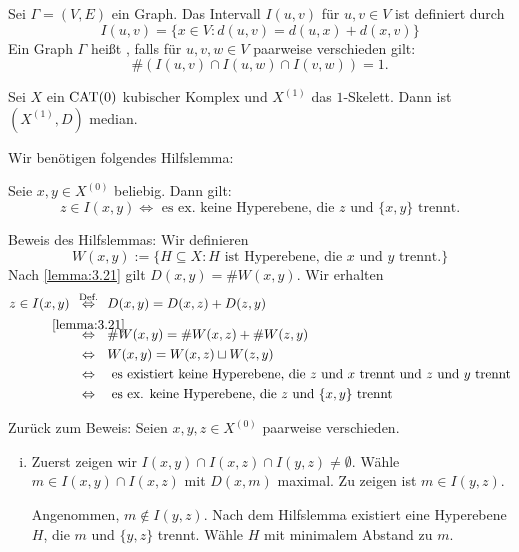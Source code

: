 \begin{definition}
	\label{def:3.22}
		Sei $\Gamma = (V,E)$ ein Graph.
		Das Intervall $I(u,v)$ für $u,v \in V$ ist definiert durch 
		\[
			I(u,v) = \{x \in V : d(u,v) = d(u,x) + d(x,v)\}
		\]
		Ein Graph $\Gamma$ heißt , falls für $u,v,w \in V$ paarweise verschieden gilt:
		\[
			\#(I(u,v) \cap I(u,w) \cap I(v,w)) = 1.
		\]
\end{definition}

\begin{satz}
	\label{satz:3.23}
		Sei $X$ ein $\operatorname{CAT(0)}$ kubischer Komplex und $X^{(1)}$ das $1$-Skelett.
		Dann ist $(X^{(1)},D)$ median.
\end{satz}

\begin{beweis}
	Wir benötigen folgendes Hilfslemma:
	
	Seie $x,y \in X^{(0)}$ beliebig.
	Dann gilt:
	\[
		z \in I(x,y) \Leftrightarrow \text{ es ex. keine Hyperebene, die } z \text{ und } \{x,y\} \text{ trennt.}
	\]
	
	Beweis des Hilfslemmas:
	Wir definieren
	\[
		W(x,y) := \{H \subseteq X : H \text{ ist Hyperebene, die } x \text{ und } y \text{ trennt.}\}
	\]
	Nach \autoref{lemma:3.21} gilt $D(x,y) = \#W(x,y)$.
	Wir erhalten
	\begin{align*}
		z \in I(x,y) &\stack{\text{Def.}}{\Leftrightarrow} D(x,y) = D(x,z) + D(z,y) \\
		&\stack{\ref{lemma:3.21}}{\Leftrightarrow} \#W(x,y) = \#W(x,z) + \#W(z,y) \\
		&\stack{}{\Leftrightarrow} W(x,y) = W(x,z) \sqcup W(z,y) \\
		&\stack{}{\Leftrightarrow} \text{ es existiert keine Hyperebene, die } z \text{ und } x \text{ trennt und } z \text{ und } y \text{ trennt} \\
		&\stack{}{\Leftrightarrow} \text{ es ex. keine Hyperebene, die } z \text{ und } \{x,y\} \text{ trennt}
	\end{align*}
	
	Zurück zum Beweis:
	Seien $x,y,z \in X^{(0)}$ paarweise verschieden.
	\begin{enumerate}[(i)]
		\item Zuerst zeigen wir $I(x,y) \cap I(x,z) \cap I(y,z) \neq \emptyset$.
		Wähle $m \in I(x,y) \cap I(x,z)$ mit $D(x,m)$ maximal.
		Zu zeigen ist $m \in I(y,z)$.
		
		Angenommen, $m \notin I(y,z)$.
		Nach dem Hilfslemma existiert eine Hyperebene $H$, die $m$ und $\{y,z\}$ trennt.
		Wähle $H$ mit minimalem Abstand zu $m$. 
		

\end{enumerate}
\end{beweis}
